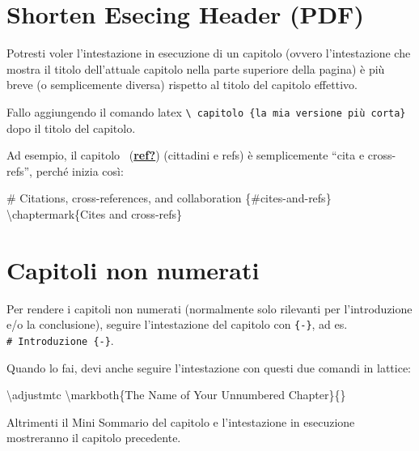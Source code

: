 \documentclass[a4paper, 11pt, nobind]{templates/ociamthesis}
\newenvironment{Shaded}{\begin{snugshade}}{\end{snugshade}}
\newcommand{\FunctionTok}[1]{\textcolor[rgb]{0.00,0.00,0.00}{#1}}
\newcommand{\NormalTok}[1]{#1}
\renewenvironment{Shaded}
{
  \vspace{10pt}%
  \begin{snugshade}%
}{%
  \end{snugshade}%
  \vspace{8pt}%
}
\begin{document}
\hypertarget{shorten-esecing-header-pdf}{%
\section{Shorten Esecing Header (PDF)}\label{shorten-esecing-header-pdf}}

Potresti voler l'intestazione in esecuzione di un capitolo (ovvero l'intestazione che mostra il titolo dell'attuale capitolo nella parte superiore della pagina) è più breve (o semplicemente diversa) rispetto al titolo del capitolo effettivo.

Fallo aggiungendo il comando latex \texttt{\textbackslash{}\ capitolo\ \{la\ mia\ versione\ più\ corta\}} dopo il titolo del capitolo.

Ad esempio, il capitolo ~(\protect\hyperlink{ref-ref}{\textbf{ref?}}) (cittadini e refs) è semplicemente ``cita e cross-refs'', perché inizia così:

\begin{Shaded}
\begin{Highlighting}[]
\FunctionTok{\# Citations, cross{-}references, and collaboration \{\#cites{-}and{-}refs\} }
\NormalTok{\textbackslash{}chaptermark\{Cites and cross{-}refs\}}
\end{Highlighting}
\end{Shaded}

\hypertarget{capitoli-non-numerati}{%
\section{Capitoli non numerati}\label{capitoli-non-numerati}}

Per rendere i capitoli non numerati (normalmente solo rilevanti per l'introduzione e/o la conclusione), seguire l'intestazione del capitolo con \texttt{\{-\}}, ad es. \texttt{\#\ Introduzione\ \{-\}}.

Quando lo fai, devi anche seguire l'intestazione con questi due comandi in lattice:

\begin{Shaded}
\begin{Highlighting}[]
\FunctionTok{\textbackslash{}adjustmtc}
\FunctionTok{\textbackslash{}markboth}\NormalTok{\{The Name of Your Unnumbered Chapter\}\{\}}
\end{Highlighting}
\end{Shaded}

Altrimenti il \hspace{0pt}\hspace{0pt}Mini Sommario del capitolo e l'intestazione in esecuzione mostreranno il capitolo precedente.
\end{document}
